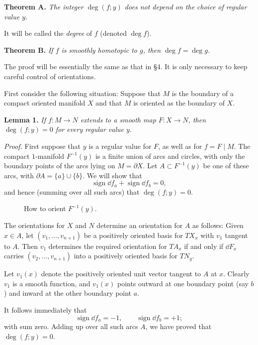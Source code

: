 
\noindent\textbf{Theorem A.} \textit{The integer $\deg(f; y)$ does not depend on the choice of regular value $y$.}

It will be called the \emph{degree} of $f$ (denoted $\deg f$).

\noindent\textbf{Theorem B.} \textit{If $f$ is smoothly homotopic to $g$, then $\deg f = \deg g$.}

The proof will be essentially the same as that in §4. It is only necessary to keep careful control of orientations.

First consider the following situation: Suppose that $M$ is the boundary of a compact oriented manifold $X$ and that $M$ is oriented as the boundary of $X$.

\noindent\textbf{Lemma 1.} \textit{If $f : M \to N$ extends to a smooth map $F : X \to N$, then $\deg(f; y) = 0$ for every regular value $y$.}

\noindent\textit{Proof.}
First suppose that $y$ is a regular value for $F$, as well as for $f = F \mid M$. The compact $1$-manifold $F^{-1}(y)$ is a finite union of arcs and circles, with only the boundary points of the arcs lying on $M = \partial X$. Let $A \subset F^{-1}(y)$ be one of these arcs, with $\partial A = \{a\} \cup \{b\}$. We will show that
\[
\operatorname{sign} \dd f_a + \operatorname{sign} \dd f_b = 0,
\]
and hence (summing over all such arcs) that $\deg(f; y) = 0$.

\begin{figure}[htbp]
\centering
\setcounter{figure}{8}%
\caption{How to orient $F^{-1}(y)$.}\label{fig:milnor-09}
\end{figure}

The orientations for $X$ and $N$ determine an orientation for $A$ as follows: Given $x \in A$, let $(v_1, \ldots, v_{n+1})$ be a positively oriented basis for $TX_x$ with $v_1$ tangent to $A$. Then $v_1$ determines the required orientation for $TA_x$ if and only if $\dd F_x$ carries $(v_2, \ldots, v_{n+1})$ into a positively oriented basis for $TN_y$.

Let $v_1(x)$ denote the positively oriented unit vector tangent to $A$ at $x$. Clearly $v_1$ is a smooth function, and $v_1(x)$ points outward at one boundary point (say $b$) and inward at the other boundary point $a$.



It follows immediately that
\[
\operatorname{sign} \dd f_a = -1, \qquad \operatorname{sign} \dd f_b = +1;
\]
with sum zero. Adding up over all such arcs $A$, we have proved that $\deg(f; y) = 0$.

